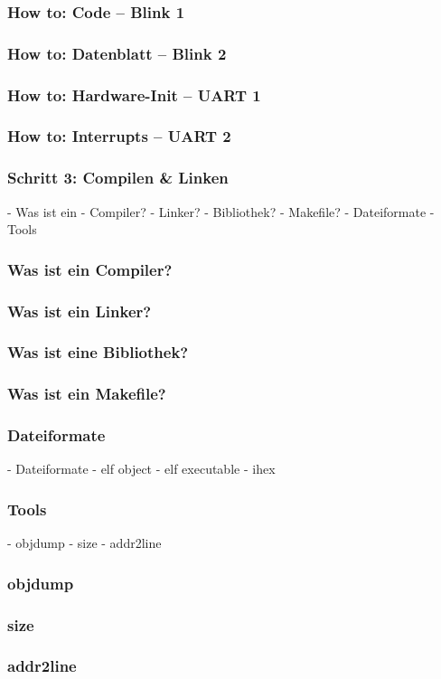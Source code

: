 \documentclass{beamer}
\begin{document}
\begin{frame}
\frametitle{How to: Code – Blink 1}
\end{frame}

\begin{frame}
\frametitle{How to: Datenblatt – Blink 2}
\end{frame}

\begin{frame}
\frametitle{How to: Hardware-Init – UART 1}
\end{frame}

\begin{frame}
\frametitle{How to: Interrupts – UART 2}
\end{frame}

\begin{frame}
\frametitle{Schritt 3: Compilen \& Linken}
- Was ist ein
    - Compiler?
    - Linker?
    - Bibliothek?
    - Makefile?
- Dateiformate
- Tools
\end{frame}

\begin{frame}
\frametitle{Was ist ein Compiler?}
\end{frame}

\begin{frame}
\frametitle{Was ist ein Linker?}
\end{frame}

\begin{frame}
\frametitle{Was ist eine Bibliothek?}
\end{frame}

\begin{frame}
\frametitle{Was ist ein Makefile?}
\end{frame}

\begin{frame}
\frametitle{Dateiformate}
- Dateiformate
    - elf object
    - elf executable
    - ihex
\end{frame}

\begin{frame}
\frametitle{Tools}
    - objdump
    - size
    - addr2line
\end{frame}

\begin{frame}
\frametitle{objdump}
\end{frame}

\begin{frame}
\frametitle{size}
\end{frame}

\begin{frame}
\frametitle{addr2line}
\end{frame}
\end{document}
